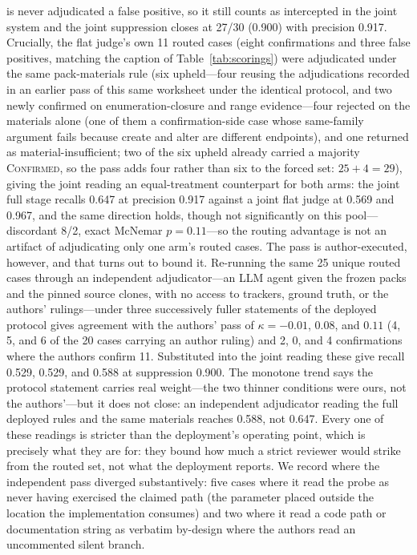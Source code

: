 \documentclass[acmsmall,screen,review,anonymous]{acmart}
\begin{document}
is never adjudicated a false positive, so it still counts as intercepted in the joint system and the joint suppression closes at 27/30 (0.900) with precision 0.917. Crucially, the flat judge's own 11 routed cases (eight confirmations and three false positives, matching the caption of Table~\ref{tab:scorings}) were adjudicated under the same pack-materials rule (six upheld---four reusing the adjudications recorded in an earlier pass of this same worksheet under the identical protocol, and two newly confirmed on enumeration-closure and range evidence---four rejected on the materials alone (one of them a confirmation-side case whose same-family argument fails because create and alter are different endpoints), and one returned as material-insufficient; two of the six upheld already carried a majority \textsc{Confirmed}, so the pass adds four rather than six to the forced set: $25 + 4 = 29$), giving the joint reading an equal-treatment counterpart for both arms: the joint full stage recalls 0.647 at precision 0.917 against a joint flat judge at 0.569 and 0.967, and the same direction holds, though not significantly on this pool---discordant 8/2, exact McNemar $p{=}0.11$---so the routing advantage is not an artifact of adjudicating only one arm's routed cases. The pass is author-executed, however, and that turns out to bound it. Re-running the same 25 unique routed cases through an independent adjudicator---an LLM agent given the frozen packs and the pinned source clones, with no access to trackers, ground truth, or the authors' rulings---under three successively fuller statements of the deployed protocol gives agreement with the authors' pass of $\kappa = -0.01$, $0.08$, and $0.11$ (4, 5, and 6 of the 20 cases carrying an author ruling) and 2, 0, and 4 confirmations where the authors confirm 11. Substituted into the joint reading these give recall 0.529, 0.529, and 0.588 at suppression 0.900. The monotone trend says the protocol statement carries real weight---the two thinner conditions were ours, not the authors'---but it does not close: an independent adjudicator reading the full deployed rules and the same materials reaches 0.588, not 0.647. Every one of these readings is stricter than the deployment's operating point, which is precisely what they are for: they bound how much a strict reviewer would strike from the routed set, not what the deployment reports. We record where the independent pass diverged substantively: five cases where it read the probe as never having exercised the claimed path (the parameter placed outside the location the implementation consumes) and two where it read a code path or documentation string as verbatim by-design where the authors read an uncommented silent branch.  
\end{document}
